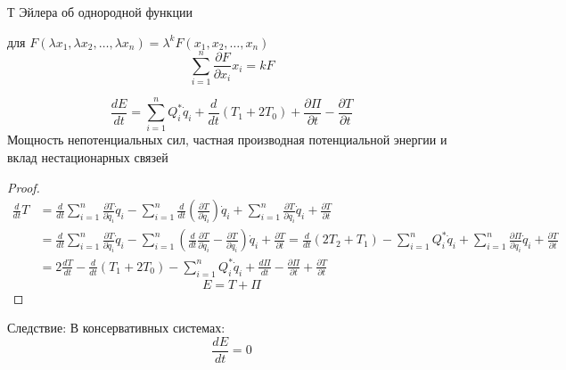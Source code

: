 \documentclass[crop=false]{standalone}
\begin{document}
\noindent \keypoint Т Эйлера об однородной функции

для $F(\lambda x_1, \lambda x_2, \dots, \lambda x_n) = \lambda^k F(x_1, x_2, \dots, x_n)$
\[\sum_{i=1}^{n} \frac{\partial F}{\partial x_i} x_i = k F\]

\begin{theorem}
    \[\frac{d E}{d t} = \sum_{i=1}^{n} Q_i^* \dot q_i + \frac{d}{d t} (T_1 + 2 T_0) + \frac{\partial \Pi}{\partial t} - \frac{\partial T}{\partial t}\]
    Мощность непотенциальных сил, частная производная потенциальной энергии и вклад нестационарных связей

\end{theorem}
\begin{proof}
    \[
        \begin{aligned}
            \frac{d}{d t} T &= \frac{d}{d t}\sum_{i=1}^{n} \frac{\partial T}{\partial \dot q_i} \dot q_i - \sum_{i=1}^{n} \frac{d}{d t}\left(\frac{\partial T}{\partial \dot q_i} \right)\dot q_i + \sum_{i=1}^{n}  \frac{\partial T}{\partial q_i} \dot q_i +\frac{\partial T}{\partial t}  \\
            &= \frac{d}{d t} \sum_{i=1}^{n} \frac{\partial T}{\partial \dot q_i} \dot q_i  - \sum_{i=1}^{n}\left(\frac{d}{d t} \frac{\partial T}{\partial \dot q_i} - \frac{\partial T}{\partial q_i} \right) \dot q_i + \frac{\partial T}{\partial t} = \frac{d}{d t} (2 T_2 + T_1) - \sum_{i=1}^{n} Q_i^* \dot q_i + \sum_{i=1}^{n} \frac{\partial \Pi}{\partial q_i} \dot q_i+ \frac{\partial T}{\partial t} \\
            &= 2 \frac{d T}{d t} - \frac{d}{d t} (T_1 + 2 T_0) - \sum_{i=1}^{n} Q_i^* \dot q_i  + \frac{d \Pi}{d t} - \frac{\partial \Pi}{\partial t} + \frac{\partial T}{\partial t}
        \end{aligned}
        \]
        \[ E = T + \Pi\]
    \end{proof}
Следствие: В консервативных системах:
\[\frac{d E}{d t} = 0\]
\end{document}
